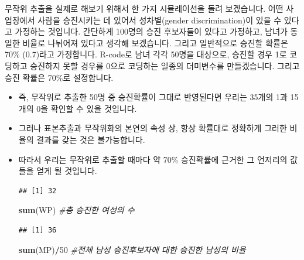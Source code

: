 \documentclass[]{book}
\newenvironment{Shaded}{\begin{snugshade}}{\end{snugshade}}
\newcommand{\CommentTok}[1]{\textcolor[rgb]{0.56,0.35,0.01}{\textit{#1}}}
\newcommand{\DecValTok}[1]{\textcolor[rgb]{0.00,0.00,0.81}{#1}}
\newcommand{\FloatTok}[1]{\textcolor[rgb]{0.00,0.00,0.81}{#1}}
\newcommand{\KeywordTok}[1]{\textcolor[rgb]{0.13,0.29,0.53}{\textbf{#1}}}
\newcommand{\NormalTok}[1]{#1}
\newcommand{\OperatorTok}[1]{\textcolor[rgb]{0.81,0.36,0.00}{\textbf{#1}}}
\newcommand{\StringTok}[1]{\textcolor[rgb]{0.31,0.60,0.02}{#1}}
\begin{document}
무작위 추출을 실제로 해보기 위해서 한 가지 시뮬레이션을 돌려 보겠습니다. 어떤 사업장에서 사람을 승진시키는 데 있어서 성차별(gender discrimination)이 있을 수 있다고 가정하는 것입니다. 간단하게 100명의 승진 후보자들이 있다고 가정하고, 남녀가 동일한 비율로 나뉘어져 있다고 생각해 보겠습니다. 그리고 일반적으로 승진할 확률은 70\% (0.7)라고 가정합니다. R-code로 남녀 각각 50명을 대상으로, 승진할 경우 1로 코딩하고 승진하지 못할 경우를 0으로 코딩하는 일종의 더미변수를 만들겠습니다. 그리고 승진 확률은 70\%로 설정합니다.

\begin{itemize}
\item
  즉, 무작위로 추출한 50명 중 승진확률이 그대로 반영된다면 우리는 35개의 1과 15개의 0을 확인할 수 있을 것입니다.
\item
  그러나 표본추출과 무작위화의 본연의 속성 상, 항상 확률대로 정확하게 그러한 비율의 결과를 갖는 것은 불가능합니다.
\item
  따라서 우리는 무작위로 추출할 때마다 약 70\% 승진확률에 근거한 그 언저리의 값들을 얻게 될 것입니다.

\begin{Shaded}
\end{Shaded}

\begin{verbatim}
## [1] 32
\end{verbatim}

\begin{Shaded}
\begin{Highlighting}[]
\KeywordTok{sum}\NormalTok{(WP) }\CommentTok{#총 승진한 여성의 수}
\end{Highlighting}
\end{Shaded}

\begin{verbatim}
## [1] 36
\end{verbatim}

\begin{Shaded}
\begin{Highlighting}[]
\KeywordTok{sum}\NormalTok{(MP)}\OperatorTok{/}\DecValTok{50} \CommentTok{#전체 남성 승진후보자에 대한 승진한 남성의 비율}
\end{Highlighting}
\end{Shaded}


\end{itemize}
\end{document}
